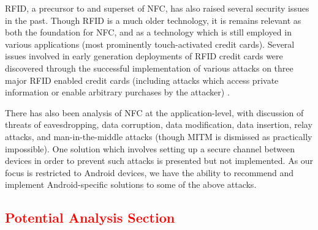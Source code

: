 \documentclass[12pt]{article}
\newcommand\TODO[1]{\textcolor{red}{#1}}
\begin{document}
RFID, a precursor to and superset of NFC, has also raised several security issues in the past.
Though RFID is a much older technology, it is remains relevant as both the foundation for NFC, and as a technology which is still employed in various applications (most prominently touch-activated credit cards).
Several issues involved in early generation deployments of RFID credit cards were discovered through the successful implementation of various attacks on three major RFID enabled credit cards (including attacks which access private information or enable arbitrary purchases by the attacker)\cite{heydtbenjamin2007} .

There has also been analysis of NFC at the application-level, with discussion of threats of eavesdropping, data corruption, data modification, data insertion, relay attacks\cite{francis2012}, and man-in-the-middle attacks (though MITM is dismissed as practically impossible).
One solution which involves setting up a secure channel between devices in order to prevent such attacks\cite{haselsteiner2006} is presented but not implemented. As our focus is restricted to Android devices, we have the ability to recommend and implement Android-specific solutions to some of the above attacks. 
\TODO{\subsection{Potential Analysis Section}}
\end{document}
